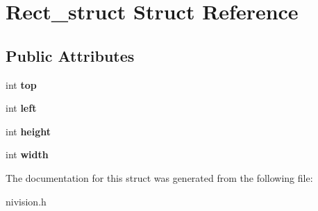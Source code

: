 \hypertarget{structRect__struct}{\section{\-Rect\-\_\-struct \-Struct \-Reference}
\label{structRect__struct}
}
\subsection*{\-Public \-Attributes}
\begin{DoxyCompactItemize}
\item 
\hypertarget{structRect__struct_a87ebf8a6280b23db750fd6d4e358d62b}{int {\bfseries top}}\label{structRect__struct_a87ebf8a6280b23db750fd6d4e358d62b}

\item 
\hypertarget{structRect__struct_a261b0001e6bd3dd2118e561e2dc1b838}{int {\bfseries left}}\label{structRect__struct_a261b0001e6bd3dd2118e561e2dc1b838}

\item 
\hypertarget{structRect__struct_a4033be30e4966e318c9bd115538c6163}{int {\bfseries height}}\label{structRect__struct_a4033be30e4966e318c9bd115538c6163}

\item 
\hypertarget{structRect__struct_ab21213efdd7b95b183b2859fe7dff978}{int {\bfseries width}}\label{structRect__struct_ab21213efdd7b95b183b2859fe7dff978}

\end{DoxyCompactItemize}


\-The documentation for this struct was generated from the following file\-:\begin{DoxyCompactItemize}
\item 
nivision.\-h\end{DoxyCompactItemize}
